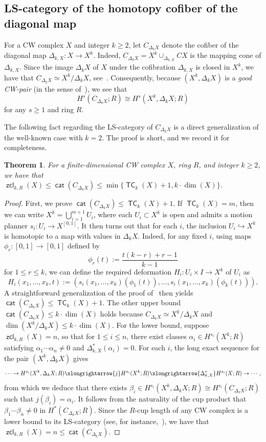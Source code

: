 \documentclass[amscd,amssymb,verbatim,10pt]{amsart}
\numberwithin{equation}{section}
\theoremstyle{plain}
\newtheorem{thm}{Theorem}[section]
\theoremstyle{definition}
\DeclareMathOperator{\cat}{{\mathsf{cat}}}
\DeclareMathOperator{\TC}{{\mathsf{TC}}}
\DeclareMathOperator{\zcl}{{\mathsf{zcl}}}
\begin{document}
\subsection{LS-category of the homotopy cofiber of the diagonal map}
For a CW complex $X$ and integer $k\ge 2$, let $C_{\Delta_kX}$ denote the cofiber of the diagonal map $\Delta_{k,X}\colon X\to X^k$. Indeed, $C_{\Delta_kX}=X^k\cup_{\Delta_{k,X}}CX$ is the mapping cone of $\Delta_{k,X}$. Since the image $\Delta_kX$ of $X$ under the cofibration $\Delta_{k,X}$ is closed in $X^k$, we have that $C_{\Delta_kX}\simeq X^k/\Delta_kX$, see~\cite{Ha}. Consequently, because $(X^k,\Delta_{k}X)$ is a \emph{good CW-pair} (in the sense of~\cite{Ha}), we see that
\[
H^s(C_{\Delta_kX};R) \cong H^s(X^k,\Delta_kX;R)    
\]
for any $s\ge 1$ and ring $R$.

The following fact regarding the LS-category of $C_{\Delta_kX}$ is a direct generalization of the well-known case with $k=2$. The proof is short, and we record it for completeness.

\begin{thm}\label{thm: cat prelim}
    For a finite-dimensional CW complex $X$, ring $R$, and integer $k\ge 2$, we have that $\zcl_{k,R}(X)\le \cat(C_{\Delta_kX})\le\min\{\TC_k(X)+1, k\cdot\dim(X)\}$.
\end{thm}

\begin{proof}
    First, we prove $\cat(C_{\Delta_kX})\le \TC_k(X)+1$. If $\TC_k(X)=m$, then we can write $X^k=\bigcup_{i=1}^{m+1}U_i$, where each $U_i\subset X^k$ is open and admits a motion planner $s_i\colon U_i\to X^{[0,1]}$. It then turns out that for each $i$, the inclusion $U_i\hookrightarrow X^k$ is homotopic to a map with values in $\Delta_kX$. Indeed, for any fixed $i$, using maps $\phi_r\colon [0,1]\to [0,1]$ defined by
    \[
    \phi_r(t):=\frac{t(k-r)+r-1}{k-1}
    \]
    for $1\le r \le k$, we can define the required deformation $H_i\colon U_i\times I\to X^k$ of $U_i$ as
    \[ H_i(x_1,\ldots,x_k,t):=\left(s_i(x_1,\ldots,x_k)(\phi_1(t)),\ldots,s_i(x_1,\ldots,x_k)(\phi_k(t))\right).
    \]
    A straightforward generalization of the proof of~\cite[Lemma~18.3]{Far2} then yields $\cat(C_{\Delta_kX})\le\TC_k(X)+1$. The other upper bound $\cat(C_{\Delta_kX})\le k\cdot\dim(X)$ holds because $C_{\Delta_kX}\simeq X^k/\Delta_kX$ and $\dim(X^k/\Delta_kX)\le k\cdot\dim(X)$. For the lower bound, suppose $\zcl_{k,R}(X)=n$, so that for $1\le i \le n$, there exist classes $\alpha_i\in H^{s_i}(X^k;R)$ satisfying $\alpha_1\cdots\alpha_n\ne 0$ and $\Delta_{k,X}^*(\alpha_i)=0$. For each $i$, the long exact sequence for the pair $(X^k,\Delta_kX)$ gives
    \[
    \cdots\to  H^{s_i}(X^k,\Delta_kX;R)\xlongrightarrow{j} H^{s_i}(X^k;R)\xlongrightarrow{\Delta_{k,X}^*} H^{s_i}(X;R)\to\cdots,
    \]
    from which we deduce that there exists $\beta_i\in H^{s_i}(X^k,\Delta_kX;R)\cong H^{s_i}(C_{\Delta_kX};R)$ such that $j(\beta_i)=\alpha_i$. It follows from the naturality of the cup product that $\beta_1\cdots\beta_n\ne 0$ in $H^*(C_{\Delta_kX};R)$. Since the $R$-cup length of any CW complex is a lower bound to its LS-category (see, for instance,~\cite[Proposition~1.5]{CLOT}), we have that $\zcl_{k,R}(X)=n\le\cat(C_{\Delta_kX})$.
\end{proof}
\end{document}
